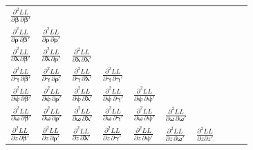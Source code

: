 \documentclass[12pt]{article}
\begin{document}
\begin{tabular}{llllllllll}
$\frac{\partial^{2} LL}{\partial \boldsymbol{\beta} \, \partial \boldsymbol{\beta}'}$ & \\

$\frac{\partial^{2} LL}{\partial \boldsymbol{\rho} \, \partial \boldsymbol{\beta}'}$ &
$\frac{\partial^{2} LL}{\partial \boldsymbol{\rho} \, \partial \boldsymbol{\rho}'}$ & & & & & & & \\

$\frac{\partial^{2} LL}{\partial \boldsymbol{\lambda} \, \partial \boldsymbol{\beta}'}$ &
$\frac{\partial^{2} LL}{\partial \boldsymbol{\lambda} \, \partial \boldsymbol{\rho}'}$ &
$\frac{\partial^{2} LL}{\partial \boldsymbol{\lambda} \, \partial \boldsymbol{\lambda}'}$ & & & & & & & \\

$\frac{\partial^{2} LL}{\partial \boldsymbol{\gamma} \, \partial \boldsymbol{\beta}'}$ &
$\frac{\partial^{2} LL}{\partial \boldsymbol{\gamma} \, \partial \boldsymbol{\rho}'}$ &
$\frac{\partial^{2} LL}{\partial \boldsymbol{\gamma} \, \partial \boldsymbol{\lambda}'}$ &
$\frac{\partial^{2} LL}{\partial \boldsymbol{\gamma} \, \partial \boldsymbol{\gamma}'}$ & & & & & & \\

$\frac{\partial^{2} LL}{\partial \boldsymbol{\psi} \, \partial \boldsymbol{\beta}'}$ &
$\frac{\partial^{2} LL}{\partial \boldsymbol{\psi} \, \partial \boldsymbol{\rho}'}$ &
$\frac{\partial^{2} LL}{\partial \boldsymbol{\psi} \, \partial \boldsymbol{\lambda}'}$ &
$\frac{\partial^{2} LL}{\partial \boldsymbol{\psi} \, \partial \boldsymbol{\gamma}'}$ &
$\frac{\partial^{2} LL}{\partial \boldsymbol{\psi} \, \partial \boldsymbol{\psi}'}$ & & & & & \\

$\frac{\partial^{2} LL}{\partial \boldsymbol{\omega} \, \partial \boldsymbol{\beta}'}$ &
$\frac{\partial^{2} LL}{\partial \boldsymbol{\omega} \, \partial \boldsymbol{\rho}'}$ &
$\frac{\partial^{2} LL}{\partial \boldsymbol{\omega} \, \partial \boldsymbol{\lambda}'}$ &
$\frac{\partial^{2} LL}{\partial \boldsymbol{\omega} \, \partial \boldsymbol{\gamma}'}$ &
$\frac{\partial^{2} LL}{\partial \boldsymbol{\omega} \, \partial \boldsymbol{\psi}'}$ &
$\frac{\partial^{2} LL}{\partial \boldsymbol{\omega} \, \partial \boldsymbol{\omega}'}$ & & & & \\

$\frac{\partial^{2} LL}{\partial z \, \partial \boldsymbol{\beta}'}$ &
$\frac{\partial^{2} LL}{\partial z \, \partial \boldsymbol{\rho}'}$ &
$\frac{\partial^{2} LL}{\partial z \, \partial \boldsymbol{\lambda}'}$ &
$\frac{\partial^{2} LL}{\partial z \, \partial \boldsymbol{\gamma}'}$ &
$\frac{\partial^{2} LL}{\partial z \, \partial \boldsymbol{\psi}'}$ &
$\frac{\partial^{2} LL}{\partial z \, \partial \boldsymbol{\omega}'}$ &
$\frac{\partial^{2} LL}{\partial z \partial z'}$ & & \\


\end{tabular}
\end{document}
